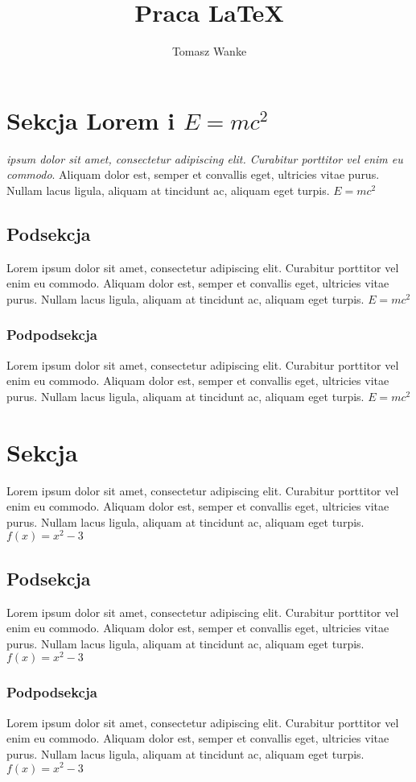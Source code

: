 \documentclass[10pt,a4paper]{article}
\title{Praca LaTeX}
\author{Tomasz Wanke}
\begin{document}
\maketitle
\newpage
\tableofcontents
\newpage
\section{Sekcja Lorem i $E=mc^2$}
\textit{ipsum dolor sit amet, consectetur adipiscing elit. Curabitur porttitor vel enim eu commodo}. Aliquam dolor est, semper et convallis eget, ultricies vitae purus. Nullam lacus ligula, aliquam at tincidunt ac, aliquam eget turpis.
$E=mc^2$
\subsection{Podsekcja}
Lorem ipsum dolor sit amet, consectetur adipiscing elit. Curabitur porttitor vel enim eu commodo. Aliquam dolor est, semper et convallis eget, ultricies vitae purus. Nullam lacus ligula, aliquam at tincidunt ac, aliquam eget turpis.
$E=mc^2$
\subsubsection{Podpodsekcja}
Lorem ipsum dolor sit amet, consectetur adipiscing elit. Curabitur porttitor vel enim eu commodo. Aliquam dolor est, semper et convallis eget, ultricies vitae purus. Nullam lacus ligula, aliquam at tincidunt ac, aliquam eget turpis.
\textbf{$E=mc^2$}
\newpage
\section{Sekcja}
Lorem ipsum dolor sit amet, consectetur adipiscing elit. Curabitur porttitor vel enim eu commodo. Aliquam dolor est, semper et convallis eget, ultricies vitae purus. Nullam lacus ligula, aliquam at tincidunt ac, aliquam eget turpis.
$f(x)=x^2-3$
\subsection{Podsekcja}
Lorem ipsum dolor sit amet, consectetur adipiscing elit. Curabitur porttitor vel enim eu commodo. Aliquam dolor est, semper et convallis eget, ultricies vitae purus. Nullam lacus ligula, aliquam at tincidunt ac, aliquam eget turpis.
$f(x)=x^2-3$
\subsubsection{Podpodsekcja}
Lorem ipsum dolor sit amet, consectetur adipiscing elit. Curabitur porttitor vel enim eu commodo. Aliquam dolor est, semper et convallis eget, ultricies vitae purus. Nullam lacus ligula, aliquam at tincidunt ac, aliquam eget turpis.
$f(x)=x^2-3$
\newpage
\end{document}

